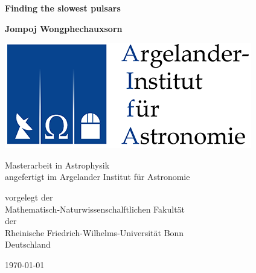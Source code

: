 \documentclass[a4paper, 10pt, twoside]{book}
\def\title{Finding the slowest pulsars}
\def\thesisauthor{Jompoj Wongphechauxsorn}
\begin{document}
    \frontmatter  %

    \begin{titlepage}
        \begin{center}
            \vspace{0.5cm}

            \Huge
            \textbf{\title}

            \vspace{0.5cm}
            \LARGE

            \vspace{1.5cm}

            \textbf{\thesisauthor}

            \vspace{4cm}

            \begin{center}
                \includegraphics{figures/logo_aifa}
            \end{center}

            \vfill

            Masterarbeit in Astrophysik\\
            angefertigt im Argelander Institut f\"ur Astronomie

            \vspace{0.5cm}

            \Large
            vorgelegt der \\
            Mathematisch-Naturwissenschalftlichen Fakult\"at \\
            der \\
            Rheinische Friedrich-Wilhelms-Universit\"at Bonn\\
            Deutschland

            \vspace{0.5cm}

            \LARGE
            \today

        \end{center}
    \end{titlepage}
\end{document}

